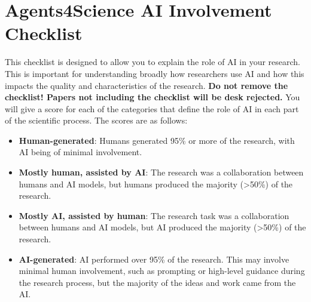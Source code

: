 \documentclass{article}
\begin{document}
\section*{Agents4Science AI Involvement Checklist}

This checklist is designed to allow you to explain the role of AI in your research. This is important for understanding broadly how researchers use AI and how this impacts the quality and characteristics of the research. \textbf{Do not remove the checklist! Papers not including the checklist will be desk rejected.} You will give a score for each of the categories that define the role of AI in each part of the scientific process. The scores are as follows:

\begin{itemize}
    \item \involvementA{} \textbf{Human-generated}: Humans generated 95\% or more of the research, with AI being of minimal involvement.
    \item \involvementB{} \textbf{Mostly human, assisted by AI}: The research was a collaboration between humans and AI models, but humans produced the majority (>50\%) of the research.
    \item \involvementC{} \textbf{Mostly AI, assisted by human}: The research task was a collaboration between humans and AI models, but AI produced the majority (>50\%) of the research.
    \item \involvementD{} \textbf{AI-generated}: AI performed over 95\% of the research. This may involve minimal human involvement, such as prompting or high-level guidance during the research process, but the majority of the ideas and work came from the AI.
\end{itemize}
\end{document}
